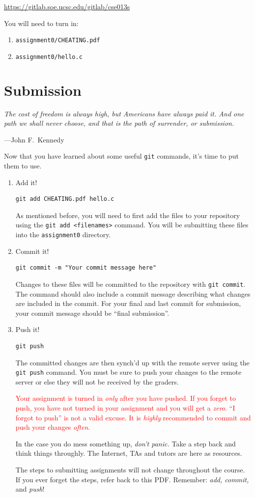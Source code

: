 \documentclass[11pt]{article}
\begin{document}
\centerline{\url{https://gitlab.soe.ucsc.edu/gitlab/cse013s}}


You will need to turn in:
\begin{enumerate}
	\item \texttt{assignment0/CHEATING.pdf}
	\item \texttt{assignment0/hello.c}
\end{enumerate}


\section{Submission}
\epigraph{\emph{The cost of freedom is always high, but Americans have always
paid it. And one path we shall never choose, and that is the path of
surrender, or submission.}}{---John F.\ Kennedy}\noindent

\noindent Now that you have learned about some useful \texttt{git} commands, it's time to put them to use.

\begin{enumerate}
\item Add it!
\begin{lstlisting}
git add CHEATING.pdf hello.c
\end{lstlisting}
As mentioned before, you will need to first add the files to
your repository using the \texttt{git add <filenames>} command. You
will be submitting these files into the \texttt{assignment0}
directory.

\item Commit it!
\begin{lstlisting}
git commit -m "Your commit message here"
\end{lstlisting}
Changes to these files will be committed to the repository with
\texttt{git commit}. The command should also include a commit message
describing what changes are included in the commit. For your final and last commit for submission, your commit message should be ``final submission''.

\item Push it!
\begin{lstlisting}
git push
\end{lstlisting}
The committed changes are then synch'd up with the remote server
using the \texttt{git push} command. You must be sure to push your
changes to the remote server or else they will not be received by
the graders.

\textcolor{red}{Your assignment is turned in \emph{only} after you have pushed.
If you forget to push, you have not turned in your assignment and you will get
a \emph{zero}. ``I forgot to push'' is not a valid excuse. It is \emph{highly} recommended to commit and push your changes \emph{often}.}

In the case you do mess something up, \emph{don't panic.} Take a step back and think things throughly. The Internet, TAs and tutors are here as resources.

The steps to submitting assignments will not change throughout the course. If you ever forget the steps, refer back to this PDF. Remember: \emph{add, commit,} and \emph{push}!
\end{enumerate}
\end{document}
